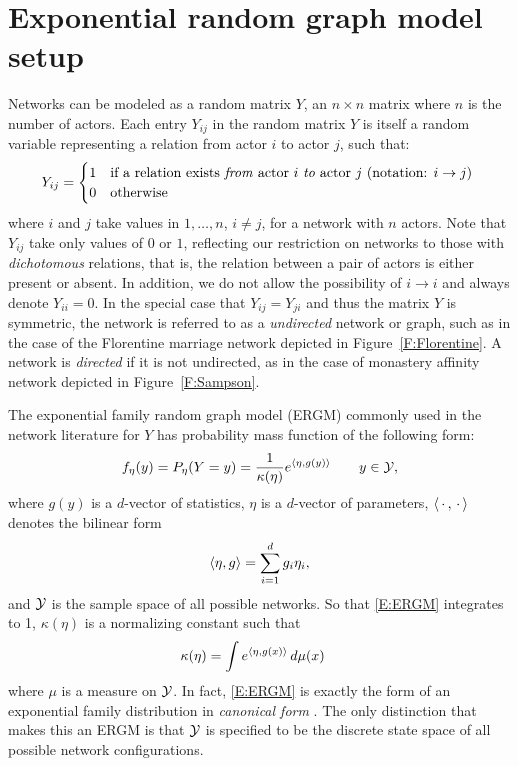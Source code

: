 \section{Exponential random graph model setup} \label{S:ERGM setup}
Networks can be modeled as a random matrix $Y$, an $n \times n$ matrix where $n$ is 
the number of actors.
Each entry $Y_{ij}$ in the random matrix $Y$ is itself a random variable representing 
a relation from actor $i$ to actor $j$, such that:
\[
	Y_{ij} = 
	\begin{cases}
		1 & \text{if a relation exists \textit{from} actor $i$ \textit{to} actor 
$j$ (notation: $i \to j$)}\\
		0 & \text{otherwise}
	\end{cases}
	\
\]
where $i$ and $j$ take values in $1, \ldots, n$, $i \neq j$, for a network with $n$ 
actors.  Note that $Y_{ij}$ take only values of $0$ or $1$, reflecting our restriction 
on networks to those with \emph{dichotomous} relations, that is, the relation between a pair 
of actors is either present or absent.  In addition, we do not allow the possibility 
of $i \to i$ and always denote $Y_{ii} = 0$.  In the special case that 
$Y_{ij} = Y_{ji}$ and thus the matrix $Y$ is symmetric, the network is referred to as a \textit
{undirected} network or graph, such as in the case of the Florentine marriage network 
depicted in Figure~\ref{F:Florentine}.  A network is \textit{directed} if it is not 
undirected, as in the case of monastery affinity network depicted in 
Figure~\ref{F:Sampson}.  

The exponential family random graph model (ERGM) commonly used in the network 
literature for $Y$ has probability mass function of the following form:
\begin{align}
	f_\eta(y) = P_{\eta}(Y=y) = \frac{1}{ \kappa( \eta) } e^{ \langle  \eta, g(y) \rangle  } \qquad y \in {\mathcal Y}, \label{E:ERGM}
\end{align}
where $g(y)$ is a $d$-vector of statistics, $\eta$ is a $d$-vector of parameters, 
$\langle \,\cdot\,,\,\cdot\, \rangle$ denotes the bilinear form
\begin{align*}
	\langle  \eta, g  \rangle = \sum_{i=1}^d g_i \eta_i,
\end{align*}
and ${\mathcal Y}$ is the sample space of all possible networks.
So that \eqref{E:ERGM} integrates to 1, $\kappa(\eta)$ is a normalizing constant such that
\begin{align}
   \kappa(\eta) &= \int e^{ \langle  \eta, g(x) \rangle  } \, d \mu(x) \label{E:kappa}
\end{align}
where $\mu$ is a measure on ${\mathcal Y}$.  In fact, \eqref{E:ERGM} is exactly the form of 
an exponential family distribution in \emph{canonical form} \citep{tpe}.  The only distinction that makes this an ERGM is that ${\mathcal Y}$ is specified to be the 
discrete state space of all possible network configurations.

